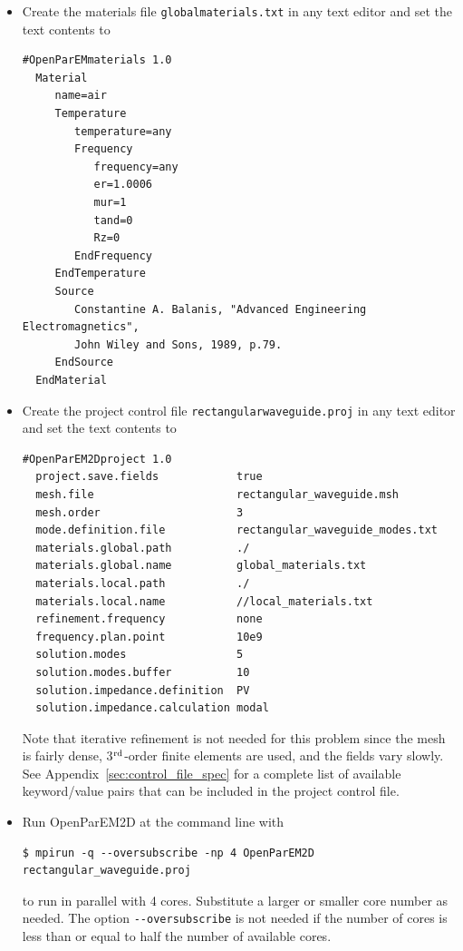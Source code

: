 \documentclass[titlepage]{article}
\renewcommand\_{\textunderscore\linebreak[1]}
\begin{document}
\begin{itemize}

\item Create the materials file \texttt{global\_materials.txt} in any text editor and set the text contents to
\begin{Verbatim}[fontsize=\small]
  #OpenParEMmaterials 1.0
  Material
     name=air
     Temperature
        temperature=any
        Frequency
           frequency=any
           er=1.0006
           mur=1
           tand=0
           Rz=0
        EndFrequency
     EndTemperature
     Source
        Constantine A. Balanis, "Advanced Engineering Electromagnetics",
        John Wiley and Sons, 1989, p.79.
     EndSource
  EndMaterial
\end{Verbatim}
\item Create the project control file \texttt{rectangular\_waveguide.proj} in any text editor and set the text contents to
\begin{Verbatim}[fontsize=\small]
  #OpenParEM2Dproject 1.0
  project.save.fields            true
  mesh.file                      rectangular_waveguide.msh
  mesh.order                     3
  mode.definition.file           rectangular_waveguide_modes.txt
  materials.global.path          ./
  materials.global.name          global_materials.txt
  materials.local.path           ./
  materials.local.name           //local_materials.txt
  refinement.frequency           none
  frequency.plan.point           10e9
  solution.modes                 5
  solution.modes.buffer          10
  solution.impedance.definition  PV
  solution.impedance.calculation modal
\end{Verbatim}

\noindent Note that iterative refinement is not needed for this problem since the mesh is fairly dense, 3$^{\textnormal{rd}}$-order finite elements are used, and the fields vary slowly.  See Appendix~\ref{sec:control_file_spec} for a complete list of available keyword/value pairs that can be included in the project control file.

\item Run OpenParEM2D at the command line with
\begin{Verbatim}[fontsize=\small]
   $ mpirun -q --oversubscribe -np 4 OpenParEM2D rectangular_waveguide.proj
\end{Verbatim}
to run in parallel with 4 cores.  Substitute a larger or smaller core number as needed.  The option \verb+--oversubscribe+ is not needed if the number of cores is less than or equal to half the number of available cores.
\end{itemize}
\end{document}
